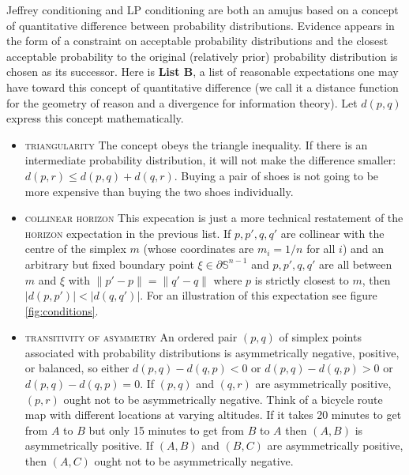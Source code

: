\documentclass[12pt]{article}
\begin{document}
Jeffrey conditioning and LP conditioning are both an amujus based on a
concept of quantitative difference between probability distributions.
Evidence appears in the form of a constraint on acceptable probability
distributions and the closest acceptable probability to the original
(relatively prior) probability distribution is chosen as its
successor. Here is \textbf{List B}\label{page:listtwo}, a list of
reasonable expectations one may have toward this concept of
quantitative difference (we call it a distance function for the
geometry of reason and a divergence for information theory). Let
$d(p,q)$ express this concept mathematically.

\begin{itemize}
\item \textsc{triangularity} The concept obeys the triangle
  inequality. If there is an intermediate probability distribution, it
  will not make the difference smaller: $d(p,r)\leq{}d(p,q)+d(q,r)$.
  Buying a pair of shoes is not going to be more expensive than buying
  the two shoes individually.
\item \textsc{collinear horizon} This expecation is just a more
  technical restatement of the \textsc{horizon} expectation in the
  previous list. If $p,p',q,q'$ are collinear with the centre of the
  simplex $m$ (whose coordinates are $m_{i}=1/n$ for all $i$) and an
  arbitrary but fixed boundary point $\xi\in\partial\mathbb{S}^{n-1}$
  and $p,p',q,q'$ are all between $m$ and $\xi$ with
  $\|p'-p\|=\|q'-q\|$ where $p$ is strictly closest to $m$, then
  $|d(p,p')|<|d(q,q')|$. For an illustration of this expectation see
  figure \ref{fig:conditions}. 
\item \textsc{transitivity of asymmetry} An ordered pair $(p,q)$ of
  simplex points associated with probability distributions is
  asymmetrically negative, positive, or balanced, so either
  $d(p,q)-d(q,p)<0$ or $d(p,q)-d(q,p)>0$ or $d(p,q)-d(q,p)=0$. If
  $(p,q)$ and $(q,r)$ are asymmetrically positive, $(p,r)$ ought not
  to be asymmetrically negative. Think of a bicycle route map with
  different locations at varying altitudes. If it takes 20 minutes to
  get from $A$ to $B$ but only 15 minutes to get from $B$ to $A$ then
  $(A,B)$ is asymmetrically positive. If $(A,B)$ and $(B,C)$ are
  asymmetrically positive, then $(A,C)$ ought not to be asymmetrically
  negative.
\end{itemize}
\end{document}
